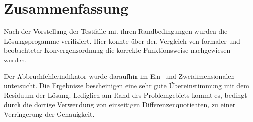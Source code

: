 \section{Zusammenfassung}
Nach der Vorstellung der Testfälle mit ihren Randbedingungen wurden
die Lösungsprogamme verifiziert. Hier konnte über den Vergleich von formaler
und beobachteter Konvergenzordnung die korrekte Funktionsweise nachgewiesen werden.

Der Abbruchfehlerindikator wurde daraufhin im Ein- und Zweidimensionalen untersucht.
Die Ergebnisse bescheinigen eine sehr gute Übereinstimmung mit dem Residuum
der Lösung. Lediglich am Rand des Problemgebiets kommt es, bedingt durch die dortige Verwendung von
einseitigen Differenzenquotienten, zu einer Verringerung der Genauigkeit.

\clearpage
